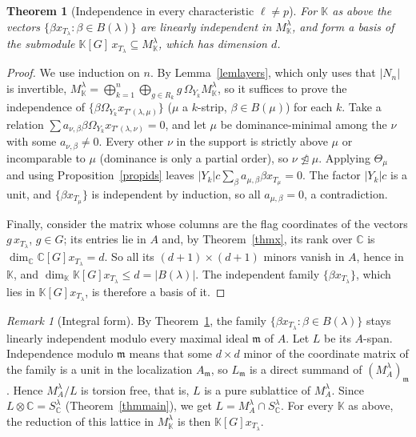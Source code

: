 \documentclass[11pt, letterpaper]{amsart}
\newtheorem{theorem}{Theorem}
\theoremstyle{definition}
\theoremstyle{remark}
\newtheorem{remark}{Remark}
\newcommand{\KK}{\mathbb{K}}
\newcommand{\CC}{\mathbb{C}}
\newcommand{\domeq}{\trianglelefteq}
\begin{document}
\begin{theorem}[Independence in every characteristic $\ell\ne p$]\label{thmindep}
For $\KK$ as above the vectors $\{\beta x_{T_\lambda}:\beta\in B(\lambda)\}$ are linearly independent in $M^\lambda_\KK$, and form a basis of the submodule $\KK[G]\,x_{T_\lambda}\subseteq M^\lambda_\KK$, which has dimension $d$.
\end{theorem}
\begin{proof}
We use induction on $n$. By Lemma~\ref{lemlayers}, which only uses that $|N_n|$ is invertible, $M^\lambda_\KK=\bigoplus_{k=1}^n\bigoplus_{g\in R_k}g\,\Omega_{Y_k}M^\lambda_\KK$, so it suffices to prove the independence of $\{\beta \Omega_{Y_k}x_{T'(\lambda,\mu)}\}$ ($\mu$ a $k$-strip, $\beta\in B(\mu)$) for each $k$. Take a relation $\sum a_{\nu,\beta}\beta \Omega_{Y_k}x_{T'(\lambda,\nu)}=0$, and let $\mu$ be dominance-minimal among the $\nu$ with some $a_{\nu,\beta}\ne0$. Every other $\nu$ in the support is strictly above $\mu$ or incomparable to $\mu$ (dominance is only a partial order), so $\nu\not\domeq\mu$. Applying $\Theta_\mu$ and using Proposition~\ref{propids} leaves $|Y_k|c\sum_\beta a_{\mu,\beta}\beta x_{T_\mu}=0$. The factor $|Y_k|c$ is a unit, and $\{\beta x_{T_\mu}\}$ is independent by induction, so all $a_{\mu,\beta}=0$, a contradiction.

Finally, consider the matrix whose columns are the flag coordinates of the vectors $g\,x_{T_\lambda}$, $g\in G$; its entries lie in $A$ and, by Theorem~\ref{thmx}, its rank over $\CC$ is $\dim_\CC\CC[G]x_{T_\lambda}=d$. So all its $(d+1)\times(d+1)$ minors vanish in $A$, hence in $\KK$, and $\dim_\KK\KK[G]x_{T_\lambda}\le d=|B(\lambda)|$. The independent family $\{\beta x_{T_\lambda}\}$, which lies in $\KK[G]x_{T_\lambda}$, is therefore a basis of it.
\end{proof}

\begin{remark}[Integral form]\label{remint}
By Theorem~\ref{thmindep}, the family $\{\beta x_{T_\lambda}:\beta\in B(\lambda)\}$ stays linearly independent modulo every maximal ideal $\mathfrak m$ of $A$. Let $L$ be its $A$-span. Independence modulo $\mathfrak m$ means that some $d\times d$ minor of the coordinate matrix of the family is a unit in the localization $A_\mathfrak m$, so $L_\mathfrak m$ is a direct summand of $(M^\lambda_A)_\mathfrak m$. Hence $M^\lambda_A/L$ is torsion free, that is, $L$ is a pure sublattice of $M^\lambda_A$. Since $L\otimes\CC=S^\lambda_\CC$ (Theorem~\ref{thmmain}), we get $L=M^\lambda_A\cap S^\lambda_\CC$. For every $\KK$ as above, the reduction of this lattice in $M^\lambda_\KK$ is then $\KK[G]x_{T_\lambda}$.
\end{remark}
\end{document}
